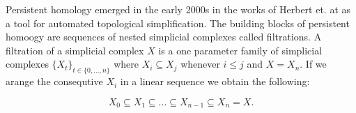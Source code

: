 
Persistent homology emerged in the early 2000s in the works of Herbert et. at \cite{persistence-original} as a tool for automated topological simplification. The building blocks of persistent homoogy are sequences of nested simplicial complexes called filtrations. A filtration of a simplicial complex $X$ is a one parameter family of simplicial complexes $\{X_t\}_{t \in \{0, ..., n\}}$ where $X_i \subseteq X_j$ whenever $i \le j$ and $X = X_n$. If we arange the consequtive $X_i$ in a linear sequence we obtain the following:


$$ X_0 \subseteq X_1 \subseteq ... \subseteq X_{n-1} \subseteq X_n = X. $$

